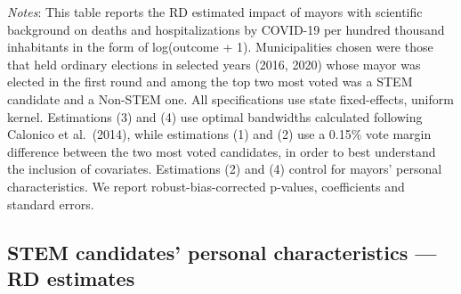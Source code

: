 \documentclass[
  letterpaper,
  DIV=11,
  numbers=noendperiod]{scrartcl}
\begin{document}
\emph{Notes}: This table reports the RD estimated impact of mayors with
scientific background on deaths and hospitalizations by COVID-19 per
hundred thousand inhabitants in the form of log(outcome + 1).
Municipalities chosen were those that held ordinary elections in
selected years (2016, 2020) whose mayor was elected in the first round
and among the top two most voted was a STEM candidate and a Non-STEM
one. All specifications use state fixed-effects, uniform kernel.
Estimations (3) and (4) use optimal bandwidths calculated following
Calonico et al.~(2014), while estimations (1) and (2) use a 0.15\% vote
margin difference between the two most voted candidates, in order to
best understand the inclusion of covariates. Estimations (2) and (4)
control for mayors' personal characteristics. We report
robust-bias-corrected p-values, coefficients and standard errors.

\subsection{STEM candidates' personal characteristics --- RD
estimates}\label{stem-candidates-personal-characteristics-rd-estimates}
\end{document}
